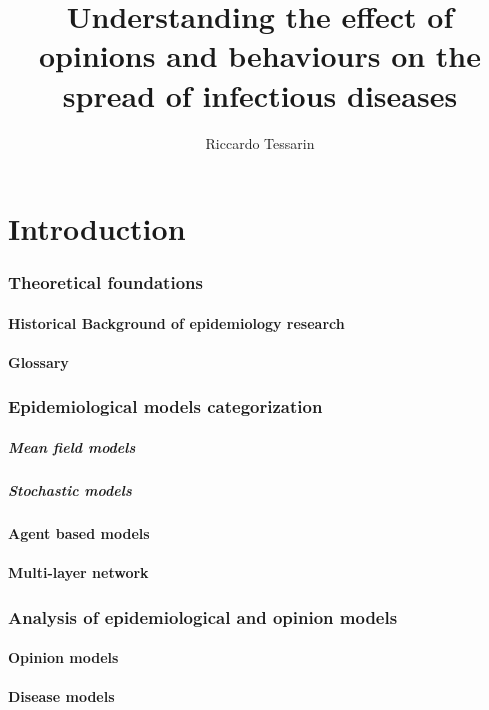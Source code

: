 \documentclass[a4paper,11pt]{scrartcl}
\title{Understanding the effect of opinions and behaviours on the spread of infectious diseases}
\subtitle{ }
\author{Riccardo Tessarin}
\date{}
\begin{document}
	
	\maketitle
	\tableofcontents
	\pagebreak
	
	
	\part{Introduction}
		\section{Theoretical foundations}
			\subsection{Historical Background of epidemiology research}
			\subsection{Glossary}
		
		\section{Epidemiological models categorization }
			\subsubsection{Mean field models}
			\subsubsection{Stochastic models}
			\subsection{Agent based models}
			\subsection{Multi-layer network}
				\section{Analysis of epidemiological and opinion models}
			\subsection{Opinion models} %
			\subsection{Disease models} %
\end{document}
